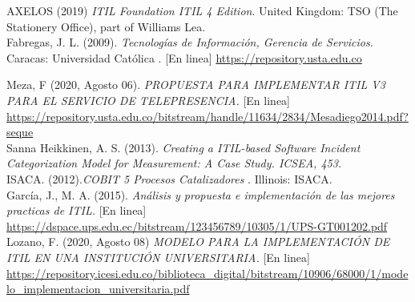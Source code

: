 \documentclass[conference]{IEEEtran}
\begin{document}
\begin{thebibliography}{9}
\hbox{}
AXELOS (2019)  \textit{ITIL Foundation ITIL 4 Edition}. United Kingdom: TSO (The Stationery Office), part of Williams Lea. \\

Fabregas, J. L. (2009).  \textit{Tecnologías de Información, Gerencia de Servicios. } Caracas: Universidad Católica . [En linea] \url{https://repository.usta.edu.co}\\

Meza, F (2020, Agosto 06).  \textit{PROPUESTA PARA IMPLEMENTAR ITIL V3 PARA EL SERVICIO DE TELEPRESENCIA.}  [En linea]
\url{https://repository.usta.edu.co/bitstream/handle/11634/2834/Mesadiego2014.pdf?seque}\\

Sanna Heikkinen, A. S. (2013).  \textit{Creating a ITIL-based Software Incident Categorization Model for Measurement: A Case Study. ICSEA, 453.} \\

ISACA. (2012).\textit{COBIT 5 Procesos Catalizadores} . Illinois: ISACA. \\

García, J., M. A. (2015). \textit{Análisis y propuesta e implementación de las mejores practicas de ITIL.} [En linea] \url{https://dspace.ups.edu.ec/bitstream/123456789/10305/1/UPS-GT001202.pdf} \\

Lozano, F. (2020, Agosto 08) \textit{MODELO PARA LA IMPLEMENTACIÓN DE ITIL EN UNA INSTITUCIÓN UNIVERSITARIA.}  [En linea] \url{https://repository.icesi.edu.co/biblioteca_digital/bitstream/10906/68000/1/modelo_implementacion_universitaria.pdf}
\hbox{}
\end{thebibliography}
\end{document}
